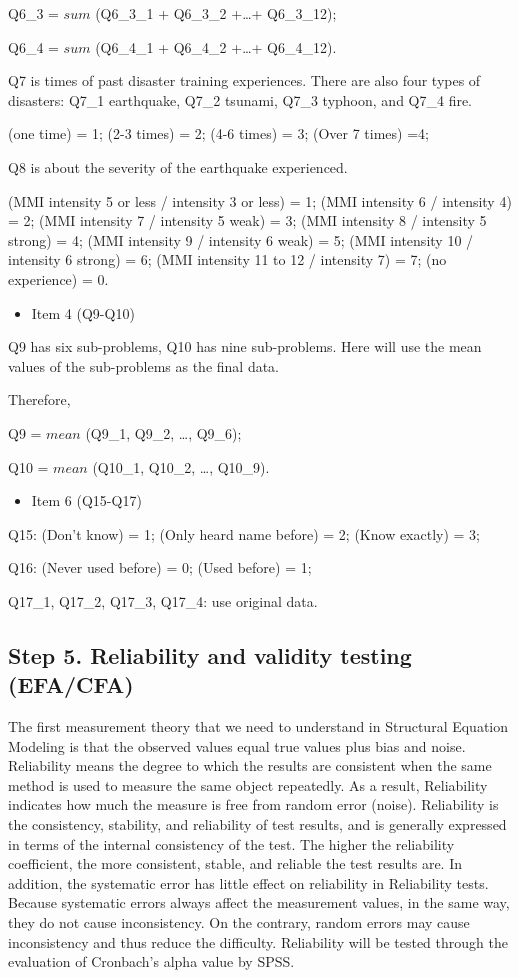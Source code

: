 Q6\_3 = $sum$ (Q6\_3\_1 + Q6\_3\_2 +\dots+ Q6\_3\_12);

Q6\_4 = $sum$ (Q6\_4\_1 + Q6\_4\_2 +\dots+ Q6\_4\_12).

Q7 is times of past disaster training experiences. There are also four types of disasters: Q7\_1 earthquake, Q7\_2 tsunami, Q7\_3 typhoon, and Q7\_4 fire.
 
(one time) = 1; (2-3 times) = 2; (4-6 times) = 3; (Over 7 times) =4;

Q8 is about the severity of the earthquake experienced.

(MMI intensity 5 or less / intensity 3 or less) = 1; (MMI intensity 6 / intensity 4) = 2; (MMI intensity 7 / intensity 5 weak) = 3; (MMI intensity 8 / intensity 5 strong) = 4; (MMI intensity 9 / intensity 6 weak) = 5; (MMI intensity 10 / intensity 6 strong) = 6; (MMI intensity 11 to 12 / intensity 7) = 7; (no experience) = 0.


\begin{itemize}
\item Item 4 (Q9-Q10)
\end{itemize}

Q9 has six sub-problems, Q10 has nine sub-problems. Here will use the mean values of the sub-problems as the final data. 

Therefore, 

Q9 = $mean$ (Q9\_1, Q9\_2, \dots, Q9\_6);

Q10 = $mean$ (Q10\_1, Q10\_2, \dots, Q10\_9).

\begin{itemize}
\item Item 6 (Q15-Q17)
\end{itemize}

Q15: (Don't know) = 1; (Only heard name before) = 2; (Know exactly) = 3;

Q16: (Never used before) = 0; (Used before) = 1;
 
Q17\_1, Q17\_2, Q17\_3, Q17\_4: use original data.

\subsection{Step 5. Reliability and validity testing (EFA/CFA)}
\label{step5}
The first measurement theory that we need to understand in Structural Equation Modeling is that the observed values equal true values plus bias and noise. Reliability means the degree to which the results are consistent when the same method is used to measure the same object repeatedly. As a result, Reliability indicates how much the measure is free from random error (noise). Reliability is the consistency, stability, and reliability of test results, and is generally expressed in terms of the internal consistency of the test. The higher the reliability coefficient, the more consistent, stable, and reliable the test results are. In addition, the systematic error has little effect on reliability in Reliability tests. Because systematic errors always affect the measurement values, in the same way, they do not cause inconsistency. On the contrary, random errors may cause inconsistency and thus reduce the difficulty. Reliability will be tested through the evaluation of Cronbach's alpha value by SPSS. 

